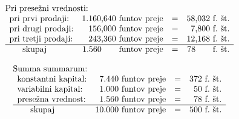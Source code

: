 \documentclass[kapital_02.tex]{subfiles}
\begin{document}
\KPEstran

\[
    \begin{array}{l}
        \textrm{Pri presežni vrednosti:} \\
        \begin{array}{l r c r}
            \textrm{pri prvi prodaji:} & \textrm{1.160,640 funtov preje} & = & \textrm{58,032~f.~št.} \\
            \textrm{pri drugi prodaji:} & \textrm{156,000 funtov preje} & = & \textrm{7,800~f.~št.} \\
            \textrm{pri tretji prodaji:} & \textrm{243,360 funtov preje} & = & \textrm{12,168~f.~št.} \\
            \hline
            \phantom{--} \textrm{skupaj} & \textrm{1.560} \phantom{--} \thinspace \thinspace \thinspace \textrm{funtov preje} & = & \textrm{78} \phantom{--} \thinspace \textrm{~f.~št.} \\
        \end{array} \\
    \end{array}
\]

\[
    \begin{array}{l}
        \textrm{Summa summarum:} \\
        \begin{array}{l r c r}
            \textrm{konstantni kapital:} & \textrm{7.440 funtov preje} & = & \textrm{372~f.~št.} \\
            \textrm{variabilni kapital:} & \textrm{1.000 funtov preje} & = & \textrm{50~f.~št.} \\
            \textrm{presežna vrednost:} & \textrm{1.560 funtov preje} & = & \textrm{78~f.~št.} \\
            \hline
            \phantom{--} \textrm{skupaj} & \textrm{10.000 funtov preje} & = & \textrm{500~f.~št.} \\
        \end{array} \\
    \end{array}
\]
\end{document}
